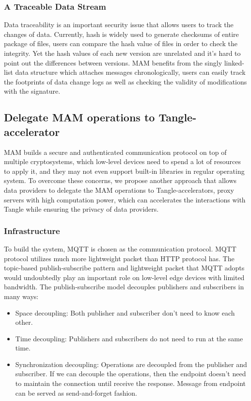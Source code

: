 \documentclass[conference]{IEEEtran}
\begin{document}
\subsubsection{A Traceable Data Stream}
Data traceability is an important security issue that allows users to track the changes of data. Currently, hash is widely used to generate checksums of entire package of files, users can compare the hash value of files in order to check the integrity. Yet the hash values of each new version are unrelated and it's hard to point out the differences between versions. MAM benefits from the singly linked-list data structure which attaches messages chronologically, users can easily track the footprints of data change logs as well as checking the validity of modifications with the signature.

\subsection{Delegate MAM operations to Tangle-accelerator}
\label{section:ta_endpoint}
MAM builds a secure and authenticated communication protocol on top of multiple cryptosystems, which low-level devices need to spend a lot of resources to apply it, and they may not even support built-in libraries in regular operating system. To overcome these concerns, we propose another approach that allows data providers to delegate the MAM operations to Tangle-accelerators, proxy servers with high computation power, which can accelerates the interactions with Tangle while ensuring the privacy of data providers.

\subsubsection{Infrastructure}
To build the system, MQTT is chosen as the communication protocol. MQTT protocol utilizes much more lightweight packet than HTTP protocol has. The topic-based publish-subscribe pattern and lightweight packet that MQTT adopts would undoubtedly play an important role on low-level edge devices with limited bandwidth. The publish-subscribe model decouples publishers and subscribers in many ways:

\begin{itemize}
    \item Space decoupling: Both publisher and subscriber don't need to know each other.
    \item Time decoupling: Publishers and subscribers do not need to run at the same time.
    \item Synchronization decoupling: Operations are decoupled from the publisher and subscriber. If we can decouple the operations, then the endpoint doesn’t need to maintain the connection until receive the response. Message from endpoint can be served as send-and-forget fashion.
\end{itemize}
\end{document}
